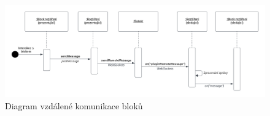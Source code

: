 \begin{figure}[ht!]
    \centering
    \includegraphics[width=1\textwidth]{media/05_realizace/vzdalenaKomunikace.pdf}
    \caption{Diagram vzdálené komunikace bloků}\label{fig:realizace/vzdalenaKomunikace}
\end{figure}
 









